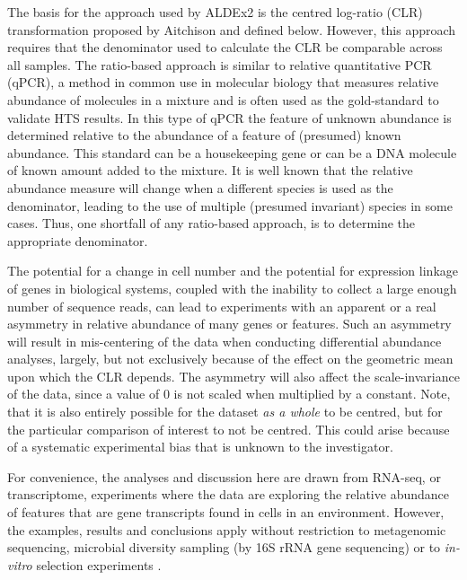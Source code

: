 \documentclass{bmcart}
\begin{document}
The basis for the approach used by ALDEx2 is the centred log-ratio (CLR) transformation proposed by Aitchison \cite{Aitchison:1986} and defined below. However, this approach requires that the denominator used to calculate the CLR be comparable across all samples.  The ratio-based approach is  similar to relative quantitative PCR (qPCR), a method in common use in molecular biology that measures relative abundance of molecules in a mixture \cite{Thellin:1999aa,Vandesompele:2002aa} and is often used as the gold-standard to validate HTS results. In this type of qPCR the feature of unknown abundance is determined relative to the abundance of a feature of (presumed) known abundance. This standard can be a housekeeping gene or can be a DNA molecule of known amount added to the mixture. It is well known that the relative abundance measure will change when a different species is used as the denominator, leading to the use of multiple (presumed invariant) species in some cases. Thus, one shortfall of any ratio-based approach, is to determine the appropriate denominator. 

The potential for a change in cell number and the potential for expression linkage of genes in biological systems, coupled with the inability to collect a large enough number of sequence reads, can lead to experiments with an apparent or a real asymmetry in relative abundance of many genes or features. Such an asymmetry will result in mis-centering of the data when conducting differential abundance analyses, largely, but not exclusively because of the effect on the geometric mean upon which the CLR depends. The asymmetry will also affect the scale-invariance of the data, since a value of 0 is not scaled when multiplied by a constant. Note, that it is also entirely possible for the dataset \emph{as a whole} to be centred, but for the particular comparison of interest to not be centred. This could arise because of a systematic experimental bias that is unknown to the investigator. 



For convenience, the analyses and discussion here are drawn from RNA-seq, or transcriptome, experiments where the data are exploring the relative abundance of features that are gene transcripts found in cells in an environment. However, the examples, results and conclusions apply without restriction to metagenomic sequencing, microbial diversity sampling (by 16S rRNA gene sequencing) or to \textit{in-vitro} selection experiments \cite{fernandes:2014,mcmurrough:2014,gloorFrontiers:2017}. 
\end{document}
